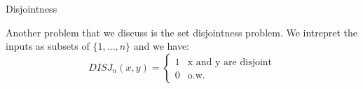     \begin{frame}{Disjointness}
        \begin{example}
        Another problem that we discuss is the set disjointness problem. We intrepret the inputs as subsets of $\{1,\dots, n\}$ and we have:
        \begin{equation*}
            DISJ_{n}(x,y) =
    \begin{cases}
        1 & \text{x and y are disjoint}\\
        0 & \text{o.w.}
    \end{cases}
        \end{equation*}
        \end{example}
\end{frame}